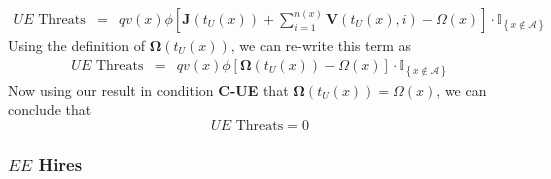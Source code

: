 \begin{eqnarray*}
\text{$UE$ Threats} & = & qv\left( x\right) \phi \left[ \boldsymbol{J}\left(
t_{U}\left( x\right) \right) +\sum\limits_{i=1}^{n\left( x\right) }\boldsymbol{V}%
\left( t_{U}\left( x\right) ,i\right) -\Omega \left( x\right) \right] \cdot
\mathbb{I}_{\left\{ x\notin \mathcal{A}\right\}}
\end{eqnarray*}
Using the definition of $\boldsymbol{\Omega}(t_U(x))$, we can re-write this term
as
\begin{eqnarray*}
\text{$UE$ Threats} & = & qv\left( x\right) \phi \left[ \boldsymbol{\Omega}%
\left( t_{U}\left( x\right) \right) - \Omega(x) \right] \cdot \mathbb{I}%
_{\left\{ x\notin \mathcal{A}\right\}}
\end{eqnarray*}
Now using our result in condition \textbf{C-UE} that $\boldsymbol{\Omega}\left(
t_{U}\left( x\right) \right) = \Omega(x)$, we can conclude that
\begin{equation*}
\text{$UE$ Threats} = 0
\end{equation*}

\subsubsection{$EE$ Hires}

